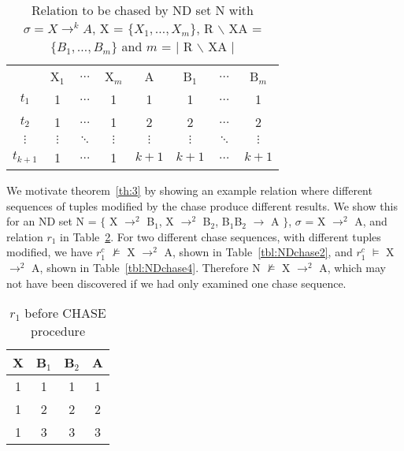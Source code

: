 {\line
\begin{table}[ht]
\begin{center}
\begin{tabular}{c|c|c|c|c|c|c|c|} \cline{2-8}
 		& X$_1$ 	& $\ldots$ 	& X$_m$ & A 	& B$_1$ & $\ldots$ 	& B$_m$ \\ \cline{2-8}
$t_1$ 		& 1  		& $\ldots$ 	& 1	&  1  	& 1 	& $\ldots$ 	& 1 \\
$t_2$ 		& 1  	& $\ldots$ 	& 1&  2  	& 2 	&  $\ldots$ 	& 2 \\
$\vdots$ 	& $\vdots$  &  $\ddots$ & $\vdots$  &  $\vdots$  & $\vdots$ & $\ddots$ & $\vdots$ \\
$t_{k+1}$ 	& 1  &  $\ldots$  &  1  & $k+1$  & $k+1$ & $\ldots$ 	& $k+1$ \\ \cline{2-8}
\end{tabular}
\end{center}
\caption{\label{tbl:rel_chase1} Relation to be chased by ND set N with
$\sigma = X \to^k A$, X = $\{ X_1, \ldots, X_m \}$, R $\backslash$ XA = $\{ B_1, \ldots, B_m \}$
and $m$ = $|$ R $\backslash$ XA $|$}
\end{table}}	


We motivate theorem~\ref{th:3} by showing an example relation where
different sequences of tuples modified by the chase produce different
results. We show this for an ND set N = $\{$ X $\to^2$ 
B$_1$,  X $\to^2$ B$_2$, B$_1$B$_2$ $\to$ A $\}$, $\sigma$ = X $\to^2$
A, and relation $r_1$ in
Table~\ref{tbl:NDchase1}. 
 For two different chase sequences, with different tuples modified, we have
$r_{1}^c$ 
$\not\models$ X $\to^2$ A, shown in Table~\ref{tbl:NDchase2}, and $r_{1}^c$ 
$\models$ X $\to^2$ A, shown in Table~\ref{tbl:NDchase4}.
Therefore 
N $\not\models$  X $\to^2$ A, which may not have been discovered if
we had only examined one chase sequence.

{\line
\begin{table}[ht]
\begin{center}
\begin{tabular}{|c|c|c|c|} \hline
 {\bf X} & {\bf B$_1$} & {\bf B$_2$} & {\bf A} \\\hline
 1 & 1 & 1 & 1 \\ 
 1 & 2 & 2 & 2 \\ 
 1 & 3 & 3 & 3 \\ \hline
\end{tabular}
\end{center}
\caption{\label{tbl:NDchase1}$r_1$ before CHASE procedure} 
\end{table}
}


